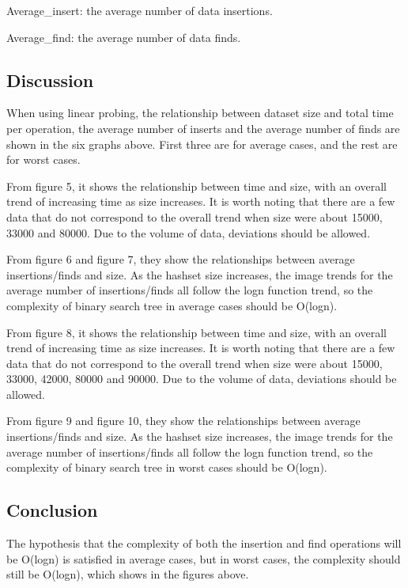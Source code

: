\documentclass[a4]{article}
\begin{document}
\noindent Average\_insert: the average number of data insertions.

\noindent Average\_find: the average number of data finds.

\subsection{Discussion}
When using linear probing, the relationship between dataset size and total time per operation, the average number of inserts and the average number of finds are shown in the six graphs above. First three are for average cases, and the rest are for worst cases.

From figure 5, it shows the relationship between time and size, with an overall trend of increasing time as size increases. It is worth noting that there are a few data that do not correspond to the overall trend when size were about 15000, 33000 and 80000. Due to the volume of data, deviations should be allowed.

From figure 6 and figure 7, they show the relationships between average insertions/finds and size. As the hashset size increases, the image trends for the average number of insertions/finds all follow the logn function trend, so the complexity of binary search tree in average cases should be O(logn).

From figure 8, it shows the relationship between time and size, with an overall trend of increasing time as size increases. It is worth noting that there are a few data that do not correspond to the overall trend when size were about 15000, 33000, 42000, 80000 and 90000. Due to the volume of data, deviations should be allowed.

From figure 9 and figure 10, they show the relationships between average insertions/finds and size. As the hashset size increases, the image trends for the average number of insertions/finds all follow the logn function trend, so the complexity of binary search tree in worst cases should be O(logn).

\subsection{Conclusion}
The hypothesis that the complexity of both the insertion and find operations will be O(logn) is satisfied in average cases, but in worst cases, the complexity should still be O(logn), which shows in the figures above.

\appendix

\end{document}
